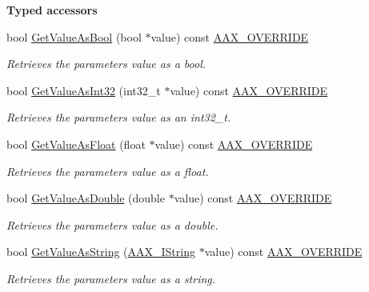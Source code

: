 \begin{Indent}\textbf{ Typed accessors}\par
\begin{DoxyCompactItemize}
\item 
bool \mbox{\hyperlink{a01537_a70d1b697d4a449b57de917baa0b50e95}{Get\+Value\+As\+Bool}} (bool $\ast$value) const \mbox{\hyperlink{a00392_ac2f24a5172689ae684344abdcce55463}{A\+A\+X\+\_\+\+O\+V\+E\+R\+R\+I\+DE}}
\begin{DoxyCompactList}\small\item\em Retrieves the parameter\textquotesingle{}s value as a bool. \end{DoxyCompactList}\item 
bool \mbox{\hyperlink{a01537_af9018dbc8c282fec893a6aa240c3a631}{Get\+Value\+As\+Int32}} (int32\+\_\+t $\ast$value) const \mbox{\hyperlink{a00392_ac2f24a5172689ae684344abdcce55463}{A\+A\+X\+\_\+\+O\+V\+E\+R\+R\+I\+DE}}
\begin{DoxyCompactList}\small\item\em Retrieves the parameter\textquotesingle{}s value as an int32\+\_\+t. \end{DoxyCompactList}\item 
bool \mbox{\hyperlink{a01537_a468c96e334e4155490fca7369f7ad323}{Get\+Value\+As\+Float}} (float $\ast$value) const \mbox{\hyperlink{a00392_ac2f24a5172689ae684344abdcce55463}{A\+A\+X\+\_\+\+O\+V\+E\+R\+R\+I\+DE}}
\begin{DoxyCompactList}\small\item\em Retrieves the parameter\textquotesingle{}s value as a float. \end{DoxyCompactList}\item 
bool \mbox{\hyperlink{a01537_ae9687028a6c6a5e93223fde4ca9c06ea}{Get\+Value\+As\+Double}} (double $\ast$value) const \mbox{\hyperlink{a00392_ac2f24a5172689ae684344abdcce55463}{A\+A\+X\+\_\+\+O\+V\+E\+R\+R\+I\+DE}}
\begin{DoxyCompactList}\small\item\em Retrieves the parameter\textquotesingle{}s value as a double. \end{DoxyCompactList}\item 
bool \mbox{\hyperlink{a01537_a7c5e951eb4c32b2993048acb414adc52}{Get\+Value\+As\+String}} (\mbox{\hyperlink{a01873}{A\+A\+X\+\_\+\+I\+String}} $\ast$value) const \mbox{\hyperlink{a00392_ac2f24a5172689ae684344abdcce55463}{A\+A\+X\+\_\+\+O\+V\+E\+R\+R\+I\+DE}}
\begin{DoxyCompactList}\small\item\em Retrieves the parameter\textquotesingle{}s value as a string. \end{DoxyCompactList}\item 

\end{DoxyCompactItemize}
\end{Indent}
